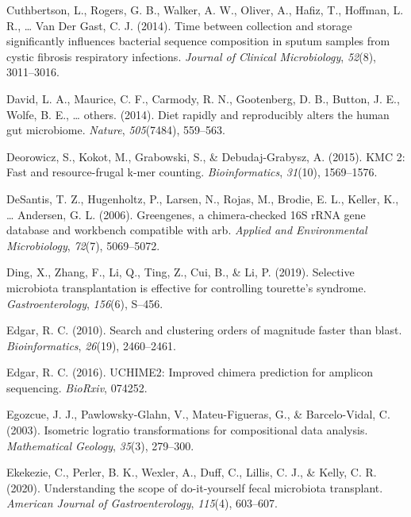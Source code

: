 \documentclass[12pt,a4paper]{reedthesis}
\theoremstyle{definition}
\theoremstyle{definition}
\theoremstyle{definition}
\theoremstyle{remark}
\begin{document}
\leavevmode\hypertarget{ref-cuthbertson2014time}{}%
Cuthbertson, L., Rogers, G. B., Walker, A. W., Oliver, A., Hafiz, T., Hoffman, L. R., \ldots{} Van Der Gast, C. J. (2014). Time between collection and storage significantly influences bacterial sequence composition in sputum samples from cystic fibrosis respiratory infections. \emph{Journal of Clinical Microbiology}, \emph{52}(8), 3011--3016.

\leavevmode\hypertarget{ref-david2014diet}{}%
David, L. A., Maurice, C. F., Carmody, R. N., Gootenberg, D. B., Button, J. E., Wolfe, B. E., \ldots{} others. (2014). Diet rapidly and reproducibly alters the human gut microbiome. \emph{Nature}, \emph{505}(7484), 559--563.

\leavevmode\hypertarget{ref-deorowicz2015kmc}{}%
Deorowicz, S., Kokot, M., Grabowski, S., \& Debudaj-Grabysz, A. (2015). KMC 2: Fast and resource-frugal k-mer counting. \emph{Bioinformatics}, \emph{31}(10), 1569--1576.

\leavevmode\hypertarget{ref-desantis2006greengenes}{}%
DeSantis, T. Z., Hugenholtz, P., Larsen, N., Rojas, M., Brodie, E. L., Keller, K., \ldots{} Andersen, G. L. (2006). Greengenes, a chimera-checked 16S rRNA gene database and workbench compatible with arb. \emph{Applied and Environmental Microbiology}, \emph{72}(7), 5069--5072.

\leavevmode\hypertarget{ref-ding2019selective}{}%
Ding, X., Zhang, F., Li, Q., Ting, Z., Cui, B., \& Li, P. (2019). Selective microbiota transplantation is effective for controlling tourette's syndrome. \emph{Gastroenterology}, \emph{156}(6), S--456.

\leavevmode\hypertarget{ref-edgar2010search}{}%
Edgar, R. C. (2010). Search and clustering orders of magnitude faster than blast. \emph{Bioinformatics}, \emph{26}(19), 2460--2461.

\leavevmode\hypertarget{ref-edgar2016uchime2}{}%
Edgar, R. C. (2016). UCHIME2: Improved chimera prediction for amplicon sequencing. \emph{BioRxiv}, 074252.

\leavevmode\hypertarget{ref-egozcue2003isometric}{}%
Egozcue, J. J., Pawlowsky-Glahn, V., Mateu-Figueras, G., \& Barcelo-Vidal, C. (2003). Isometric logratio transformations for compositional data analysis. \emph{Mathematical Geology}, \emph{35}(3), 279--300.

\leavevmode\hypertarget{ref-ekekezie2020understanding}{}%
Ekekezie, C., Perler, B. K., Wexler, A., Duff, C., Lillis, C. J., \& Kelly, C. R. (2020). Understanding the scope of do-it-yourself fecal microbiota transplant. \emph{American Journal of Gastroenterology}, \emph{115}(4), 603--607.
\end{document}
